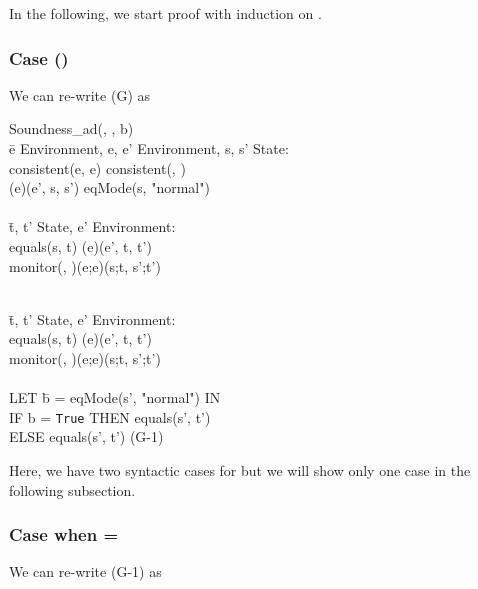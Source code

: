 \documentclass[conference]{IEEEtran}
\begin{document}
In the following, we start proof with induction on .

\subsubsection{Case ()}

We can re-write (G) as 

\begin{tabbing}
Soundness\_ad(, , b) 
\\ \=e  Environment, e, e'  Environment, s, s'  State:
\\\>consistent(e, e)  consistent(, )  
\\\>\textlbrackdbl \textrbrackdbl(e)(e', s, s')  eqMode(s, "normal")
\\
\\\> \=t, t'  State, e'  Environment: 
\\\>\>equals(s, t)  \textlbrackdbl \textrbrackdbl(e)(e', t, t')  
\\\>\> monitor(, )(e;e)(s;t, s';t')

\\\> \=t, t'  State, e'  Environment: 
\\\>\>equals(s, t)  \textlbrackdbl \textrbrackdbl(e)(e', t, t')  
\\\>\> monitor(, )(e;e)(s;t, s';t')
\\\> \=
\\\> LET \=b = eqMode(s', "normal") IN
\\\>\>IF b = \texttt{True} THEN equals(s', t') 
\\\>\> ELSE  equals(s', t')   \hspace*{2cm} (G-1)
\end{tabbing}

Here, we have two syntactic cases for  but we will show only one case in the following subsection.

\subsubsection{Case when  = }

\noindent We can re-write (G-1) as
\end{document}
